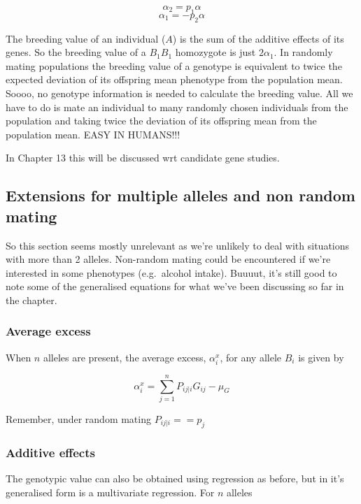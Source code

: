 \documentclass[
]{article}
\begin{document}
\[ \alpha_2 = p_1\alpha \] \[ \alpha_1 = -p_2\alpha \]

The breeding value of an individual (\(A\)) is the sum of the additive
effects of its genes. So the breeding value of a \(B_1B_1\) homozygote
is just \(2\alpha_1\). In randomly mating populations the breeding value
of a genotype is equivalent to twice the expected deviation of its
offspring mean phenotype from the population mean. Soooo, no genotype
information is needed to calculate the breeding value. All we have to do
is mate an individual to many randomly chosen individuals from the
population and taking twice the deviation of its offspring mean from the
population mean. EASY IN HUMANS!!!

In Chapter 13 this will be discussed wrt candidate gene studies.

\hypertarget{extensions-for-multiple-alleles-and-non-random-mating}{%
\subsection{Extensions for multiple alleles and non random
mating}\label{extensions-for-multiple-alleles-and-non-random-mating}}

So this section seems mostly unrelevant as we're unlikely to deal with
situations with more than 2 alleles. Non-random mating could be
encountered if we're interested in some phenotypes (e.g.~alcohol
intake). Buuuut, it's still good to note some of the generalised
equations for what we've been discussing so far in the chapter.

\hypertarget{average-excess}{%
\subsubsection{Average excess}\label{average-excess}}

When \(n\) alleles are present, the average excess, \(\alpha^x_i\), for
any allele \(B_i\) is given by

\[ \alpha^x_i = \sum_{j=1}^{n} P_{ij|i}G_{ij} - \mu_G \]

Remember, under random mating \(P_{ij|i} == p_j\)

\hypertarget{additive-effects}{%
\subsubsection{Additive effects}\label{additive-effects}}

The genotypic value can also be obtained using regression as before, but
in it's generalised form is a multivariate regression. For \(n\) alleles
\end{document}
